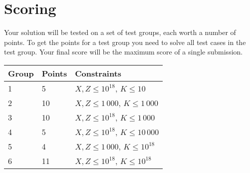 \section*{Scoring}
Your solution will be tested on a set of test groups, each worth a number of points.
To get the points for a test group you need to solve all test cases in the test group.
Your final score will be the maximum score of a single submission.

\noindent
\begin{tabular}{| l | l | l |}
\hline
Group & Points & Constraints \\ \hline
1     & 5      & $X, Z \le 10^{18}$, $K \le 10$ \\ \hline
2     & 10      & $X, Z \le 1\,000$, $K \le 1\,000$ \\ \hline
3     & 10      & $X, Z \le 10^{18}$, $K \le 1\,000$ \\ \hline
4     & 5      & $X, Z \le 10^{18}$, $K \le 10\,000$ \\ \hline
5     & 4     & $X, Z \le 1\,000$, $K \le 10^{18}$ \\ \hline
6     & 11     & $X, Z \le 10^{18}$, $K \le 10^{18}$ \\ \hline
\end{tabular}
